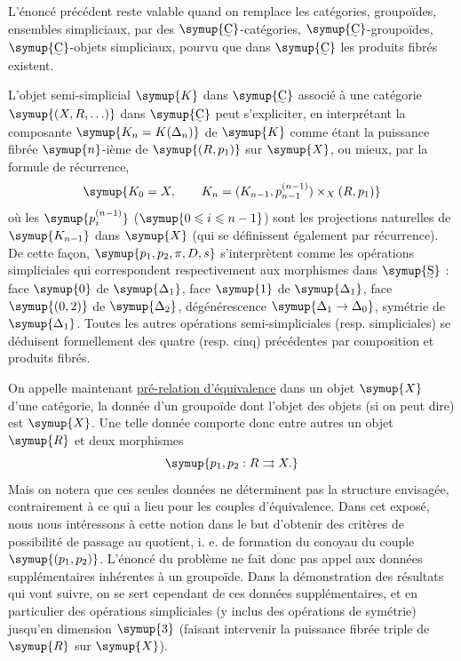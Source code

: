  L'énoncé précédent reste valable quand on remplace
les catégories, groupoïdes, ensembles simpliciaux, par des
$\symup{\text{\uwave{C}}}$-catégories, $\symup{\text{\uwave{C}}}$-groupoïdes, $\symup{\text{\uwave{C}}}$-objets
simpliciaux, pourvu que dans $\symup{\text{\uwave{C}}}$ les produits fibrés existent.

L'objet semi-simplicial $\symup{K}$ dans $\symup{\text{\uwave{C}}}$ associé à une catégorie
$\symup{(X,R,\ldots)}$ dans $\symup{\text{\uwave{C}}}$ peut s'expliciter, en interprétant la
composante $\symup{K_n=K(\Delta_n)}$ de $\symup{K}$ comme étant la puissance fibrée
$\symup{n}$-ième de $\symup{(R,p_1)}$ sur $\symup{X}$, ou mieux,
par la formule de récurrence,
\[
  \symup{K_0=X,\qquad
  K_n=(K_{n-1},p_{n-1}^{(n-1)})\times_X(R,p_1)}
\]
où les $\symup{p_i^{(n-1)}}$ ($\symup{0\leqslant i\leqslant n-1}$) sont les projections naturelles de
$\symup{K_{n-1}}$ dans $\symup{X}$ (qui se définissent également par récurrence). De cette
façon, $\symup{p_1,p_2,\pi,D,s}$ s'interprètent comme les opérations simpliciales qui
correspondent respectivement aux morphismes dans $\symup{\text{\uwave{S}}}$ : face $\symup{0}$ de
$\symup{\Delta_1}$, face $\symup{1}$ de $\symup{\Delta_1}$, face $\symup{(0,2)}$ de $\symup{\Delta_2}$,
dégénérescence $\symup{\Delta_1\to\Delta_0}$, symétrie de $\symup{\Delta_1}$. Toutes les
autres opérations semi-simpliciales (resp. simpliciales) se déduisent
formellement des quatre (resp. cinq) précédentes par composition et produits
fibrés.

On appelle maintenant \uline{pré-relation d'équivalence} dans un objet $\symup{X}$
d'une catégorie, la donnée d'un groupoïde dont l'objet des objets (si on peut
dire) est $\symup{X}$. Une telle donnée comporte donc entre autres un objet $\symup{R}$ et
deux morphismes
\[
  \symup{p_1,p_2:R\rightrightarrows X.}
\]
Mais on notera que ces seules données ne déterminent pas la structure
envisagée, contrairement à ce qui a lieu pour les couples d'équivalence. Dans
cet exposé, nous nous intéressons à cette notion dans le but d'obtenir des
critères de possibilité de passage au quotient, i. e. de formation du conoyau
du couple $\symup{(p_1,p_2)}$. L'énoncé du problème ne fait donc pas appel aux données
supplémentaires inhérentes à un groupoïde. Dans la démonstration des résultats
qui vont suivre, on se
sert cependant de ces données supplémentaires, et en particulier des
opérations simpliciales (y inclus des opérations de symétrie) jusqu'en
dimension $\symup{3}$ (faisant intervenir la puissance fibrée triple de $\symup{R}$ sur
$\symup{X}$).

